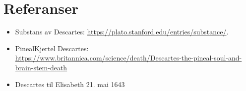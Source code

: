 \documentclass[12pt, a4paper]{article}
\begin{document}
\section{Referanser}


\begin{itemize}
    \item Substans av Descartes: \url{https://plato.stanford.edu/entries/substance/}.
    \item PinealKjertel Descartes: \url{https://www.britannica.com/science/death/Descartes-the-pineal-soul-and-brain-stem-death}
    \item Descartes til Elisabeth 21. mai 1643 
\end{itemize}
\end{document}

